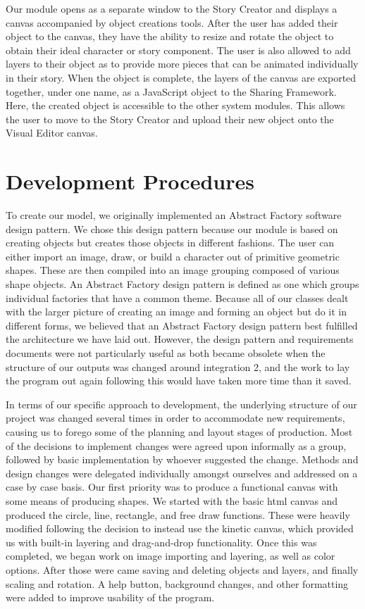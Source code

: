 \documentclass[a4paper, 11pt]{article} %
\begin{document}
Our module opens as a separate window to the Story Creator and displays a canvas accompanied by object creations tools.  After the user has added their object to the canvas, they have the ability to resize and rotate the object to obtain their ideal character or story component. The user is also allowed to add layers to their object as to provide more pieces that can be animated individually in their story. When the object is complete, the layers of the canvas are exported together, under one name, as a JavaScript object to the Sharing Framework. Here, the created object is accessible to the other system modules. This allows the user to move to the Story Creator and upload their new object onto the Visual Editor canvas. 


\section*{Development Procedures}

To create our model, we originally implemented an Abstract Factory software design pattern. We chose this design pattern because our module is based on creating objects but creates those objects in different fashions. The user can either import an image, draw, or build a character out of primitive geometric shapes. These are then compiled into an image grouping composed of various shape objects. An Abstract Factory design pattern is defined as one which groups individual factories that have a common theme. Because all of our classes dealt with the larger picture of creating an image and forming an object but do it in different forms, we believed that an Abstract Factory design pattern best fulfilled the architecture we have laid out. However, the design pattern and requirements documents were not particularly useful as both became obsolete when the structure of our outputs was changed around integration 2, and the work to lay the program out again following this would have taken more time than it saved.

        	In terms of our specific approach to development, the underlying structure of our project was changed several times in order to accommodate new requirements, causing us to forego some of the planning and layout stages of production. Most of the decisions to implement changes were agreed upon informally as a group, followed by basic implementation by whoever suggested the change. Methods and design changes were delegated individually amongst ourselves and addressed on a case by case basis.
        	Our first priority was to produce a functional canvas with some means of producing shapes. We started with the basic html canvas and produced the circle, line, rectangle, and free draw functions. These were heavily modified following the decision to instead use the kinetic canvas, which provided us with built-in layering and drag-and-drop functionality. Once this was completed, we began work on image importing and layering, as well as color options. After those were came saving and deleting objects and layers, and finally scaling and rotation. A help button, background changes, and other formatting were added to improve usability of the program.
        	
\end{document}
